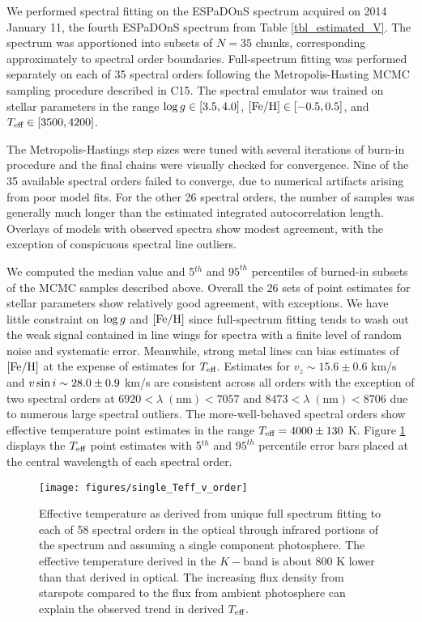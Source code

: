 \documentclass[twocolumn]{emulateapj}%
\newcommand{\iancze}{{\sc C15}}
\begin{document}
We performed spectral fitting on the ESPaDOnS spectrum acquired on 2014 January 11, the fourth ESPaDOnS spectrum from Table \ref{tbl_estimated_V}.  The spectrum was apportioned into subsets of $N=35$ chunks, corresponding approximately to spectral order boundaries.  Full-spectrum fitting was performed separately on each of 35 spectral orders following the Metropolis-Hasting MCMC sampling procedure described in \iancze.  The spectral emulator was trained on stellar parameters in the range $\log g \in [3.5, 4.0]$, $[{\rm Fe}/{\rm H}] \in [-0.5, 0.5]$, and $T_\textrm{eff} \in [3500, 4200]$.

The Metropolis-Hastings step sizes were tuned with several iterations of burn-in procedure and the final chains were visually checked for convergence.  Nine of the 35 available spectral orders failed to converge, due to numerical artifacts arising from poor model fits.  For the other 26 spectral orders, the number of samples was generally much longer than the estimated integrated autocorrelation length.  Overlays of models with observed spectra show modest agreement, with the exception of conspicuous spectral line outliers.

We computed the median value and 5$^{th}$ and $95^{th}$ percentiles of burned-in subsets of the MCMC samples described above.  Overall the 26 sets of point estimates for stellar parameters show relatively good agreement, with exceptions.  We have little constraint on $\log g$ and $[{\rm Fe}/{\rm H}]$ since full-spectrum fitting tends to wash out the weak signal contained in line wings for spectra with a finite level of random noise and systematic error.  Meanwhile, strong metal lines can bias estimates of $[{\rm Fe}/{\rm H}]$ at the expense of estimates for $T_\textrm{eff}$.  Estimates for $v_z \sim 15.6 \pm 0.6$ km/s and $v \sin i \sim 28.0 \pm 0.9$ km/s are consistent across all orders with the exception of two spectral orders at $6920 <\lambda \;(\mathrm{nm})< 7057$ and $8473 < \lambda \;(\mathrm{nm}) < 8706$ due to numerous large spectral outliers.  The more-well-behaved spectral orders show effective temperature point estimates in the range $T_\textrm{eff}=4000\pm130$ K.  Figure \ref{fig:SingleTeffvsOrder} displays the $T_\textrm{eff}$ point estimates with 5$^{th}$ and $95^{th}$ percentile error bars placed at the central wavelength of each spectral order.

\begin{figure}
 \centering
 \texttt{[image: figures/single\_Teff\_v\_order]}
 \caption{Effective temperature as derived from unique full spectrum fitting to each of 58 spectral orders in the optical through infrared portions of the spectrum and assuming a single component photosphere.  The effective temperature derived in the $K-$band is about 800 K lower than that derived in optical.  The increasing flux density from starspots compared to the flux from ambient photosphere can explain the observed trend in derived $T_\textrm{eff}$.}
 \label{fig:SingleTeffvsOrder}
\end{figure}
\end{document}
